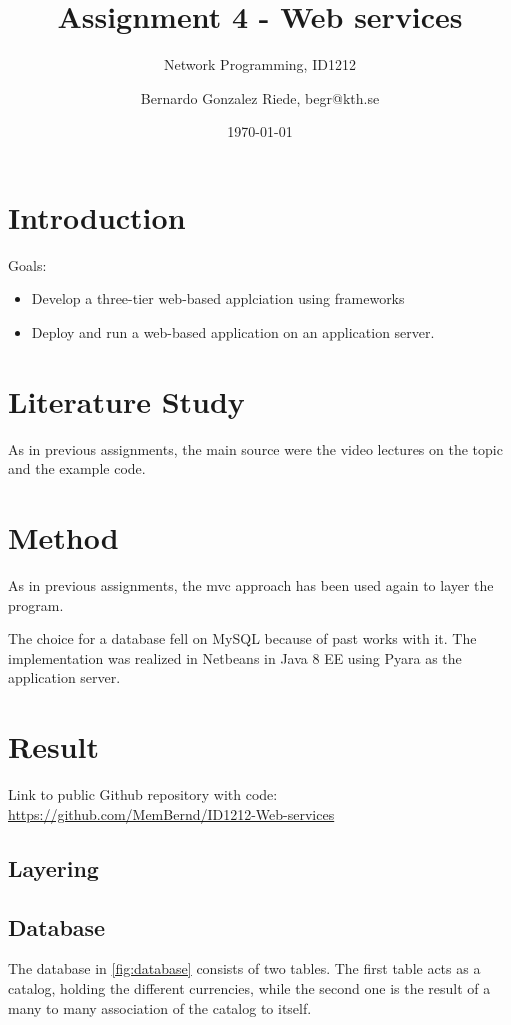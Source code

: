 \documentclass[a4paper]{scrartcl}
\title{Assignment 4 - Web services}
\subtitle{Network Programming, ID1212}
\author{Bernardo Gonzalez Riede, begr@kth.se}
\date{\today}
\begin{document}
\maketitle

\section{Introduction}
Goals:
\begin{itemize}
	\item Develop a three-tier web-based applciation using frameworks
	\item Deploy and run a web-based application on an application server.
\end{itemize}


\section{Literature Study}
As in previous assignments, the main source were the video lectures on the topic and the example code.

\section{Method}
As in previous assignments, the mvc approach has been used again to layer the program.

The choice for a database fell on MySQL because of past works with it.
The implementation was realized in Netbeans in Java 8 EE using Pyara as the application server.


\section{Result}

Link to public Github repository with code:
\href{https://github.com/MemBernd/ID1212-Web-services}{https://github.com/MemBernd/ID1212-Web-services}

\subsection{Layering}



\subsection{Database}
The database in \ref{fig:database} consists of two tables.
The first table acts as a catalog, holding the different currencies, while the second one is the result of a many to many association of the catalog to itself.
\end{document}
